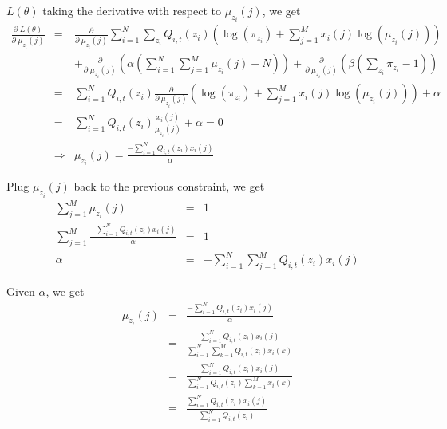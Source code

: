 \documentclass[12pt]{article}
\begin{document}
$L(\theta)$ taking the derivative with respect to $\mu_{z_i}(j)$, we get
\begin{eqnarray*}
  \frac {\partial \; L(\theta)} {\partial \; \mu_{z_i}(j)}
  &=& \frac {\partial} {\partial \; \mu_{z_i}(j)}
  \sum_{i=1}^N \sum_{z_i} Q_{i,t}(z_i) \left( \log { \left( \pi_{z_i} \right)}
      + \sum_{j=1}^M x_i(j) \log { \left( \mu_{z_i}(j) \right)} \right) \\
  && + \frac {\partial} {\partial \; \mu_{z_i}(j)} \left(
    \alpha \left( \sum_{i=1}^N \sum_{j=1}^M \mu_{z_i}(j) - N \right) \right)
    + \frac {\partial} {\partial \; \mu_{z_i}(j)} \left(
    \beta \left( \sum_{z_i} \pi_{z_i} - 1 \right) \right) \\
  &=& \sum_{i=1}^N Q_{i,t}(z_i) \frac {\partial} {\partial \; \mu_{z_i}(j)}
  \left( \log { \left( \pi_{z_i} \right)}
    + \sum_{j=1}^M x_i(j) \log { \left( \mu_{z_i}(j) \right)} \right)
  + \alpha \\
  &=& \sum_{i=1}^N Q_{i,t}(z_i) \frac {x_i(j)}{\mu_{z_i}(j)} + \alpha = 0 \\
  &\Rightarrow& \mu_{z_i}(j)
  = \frac {- \sum_{i=1}^N Q_{i,t}(z_i) x_i(j)}{\alpha} 
\end{eqnarray*}

Plug $\mu_{z_i}(j)$ back to the previous constraint, we get
\begin{eqnarray*}
  \sum_{j=1}^M \mu_{z_i}(j) &=& 1 \\
  \sum_{j=1}^M \frac {- \sum_{i=1}^N Q_{i,t}(z_i) x_i(j)}{\alpha} &=& 1 \\
  \alpha &=& - \sum_{i=1}^N \sum_{j=1}^M Q_{i,t}(z_i) x_i(j)
\end{eqnarray*}

Given $\alpha$, we get
\begin{eqnarray*}
  \mu_{z_i}(j)
  &=& \frac {- \sum_{i=1}^N Q_{i,t}(z_i) x_i(j)}{\alpha} \\
  &=& \frac {\sum_{i=1}^N Q_{i,t}(z_i) x_i(j)}
  {\sum_{i=1}^N \sum_{k=1}^M Q_{i,t}(z_i) x_i(k)} \\
  &=& \frac {\sum_{i=1}^N Q_{i,t}(z_i) x_i(j)}
  {\sum_{i=1}^N Q_{i,t}(z_i) \sum_{k=1}^M x_i(k)} \\
  &=& \frac {\sum_{i=1}^N Q_{i,t}(z_i) x_i(j)}
  {\sum_{i=1}^N Q_{i,t}(z_i)}
\end{eqnarray*}
\end{document}
